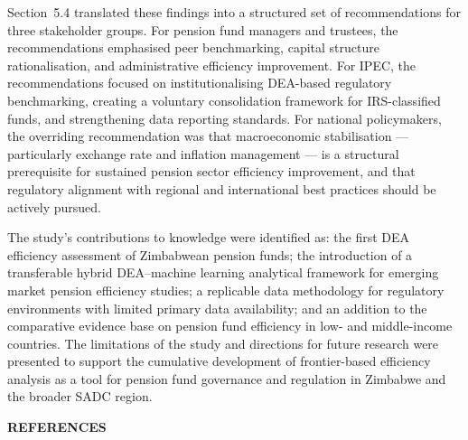 \documentclass[12pt,a4paper]{article}
\begin{document}
Section~5.4 translated these findings into a structured set of recommendations for three stakeholder groups. For pension fund managers and trustees, the recommendations emphasised peer benchmarking, capital structure rationalisation, and administrative efficiency improvement. For IPEC, the recommendations focused on institutionalising DEA-based regulatory benchmarking, creating a voluntary consolidation framework for IRS-classified funds, and strengthening data reporting standards. For national policymakers, the overriding recommendation was that macroeconomic stabilisation --- particularly exchange rate and inflation management --- is a structural prerequisite for sustained pension sector efficiency improvement, and that regulatory alignment with regional and international best practices should be actively pursued.

The study's contributions to knowledge were identified as: the first DEA efficiency assessment of Zimbabwean pension funds; the introduction of a transferable hybrid DEA--machine learning analytical framework for emerging market pension efficiency studies; a replicable data methodology for regulatory environments with limited primary data availability; and an addition to the comparative evidence base on pension fund efficiency in low- and middle-income countries. The limitations of the study and directions for future research were presented to support the cumulative development of frontier-based efficiency analysis as a tool for pension fund governance and regulation in Zimbabwe and the broader SADC region.

\newpage

\newpage
\begin{center}
    {\LARGE\bfseries REFERENCES}
\end{center}

\vspace{0.5cm}
\end{document}
